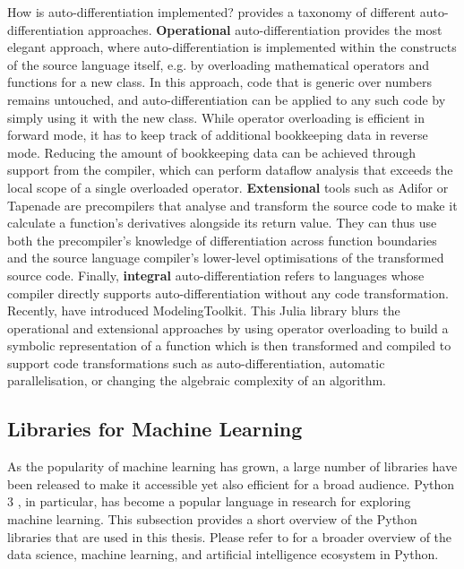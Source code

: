 How is auto-differentiation implemented? \textcite{autodiff-taxonomu-1991} provides a taxonomy of different auto-differentiation approaches. \textbf{Operational} auto-differentiation provides the most elegant approach, where auto-differentiation is implemented within the constructs of the source language itself, e.g. by overloading mathematical operators and functions for a new class. In this approach, code that is generic over numbers remains untouched, and auto-differentiation can be applied to any such code by simply using it with the new class. While operator overloading is efficient in forward mode, it has to keep track of additional bookkeeping data in reverse mode. Reducing the amount of bookkeeping data can be achieved through support from the compiler, which can perform dataflow analysis that exceeds the local scope of a single overloaded operator. \textbf{Extensional} tools such as Adifor \cite{adifor-1992} or Tapenade \cite{tapenade-autodiff-2013} are precompilers that analyse and transform the source code to make it calculate a function's derivatives alongside its return value. They can thus use both the precompiler's knowledge of differentiation across function boundaries and the source language compiler's lower-level optimisations of the transformed source code. Finally, \textbf{integral} auto-differentiation refers to languages whose compiler directly supports auto-differentiation without any code transformation. Recently, \textcite{modeling-toolkit-2021} have introduced ModelingToolkit. This Julia library blurs the operational and extensional approaches by using operator overloading to build a symbolic representation of a function which is then transformed and compiled to support code transformations such as auto-differentiation, automatic parallelisation, or changing the algebraic complexity of an algorithm.

\subsection{Libraries for Machine Learning} \label{txt:ml-libraries}

As the popularity of machine learning has grown, a large number of libraries have been released to make it accessible yet also efficient for a broad audience. Python 3 \cite{python-3.7}, in particular, has become a popular language in research for exploring machine learning. This subsection provides a short overview of the Python libraries that are used in this thesis. Please refer to \textcite{python-ml-2020} for a broader overview of the data science, machine learning, and artificial intelligence ecosystem in Python.

